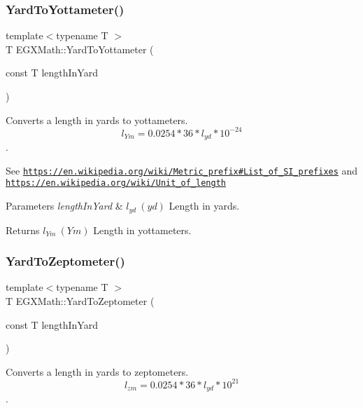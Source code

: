 \subsubsection{\texorpdfstring{Yard\+To\+Yottameter()}{YardToYottameter()}}
{\footnotesize\ttfamily template$<$typename T $>$ \\
T E\+G\+X\+Math\+::\+Yard\+To\+Yottameter (\begin{DoxyParamCaption}\item[{const T}]{length\+In\+Yard }\end{DoxyParamCaption})}



Converts a length in yards to yottameters. \[ l_{Ym}=0.0254 * 36 * l_{yd} * 10^{-24} \]. 

See \href{https://en.wikipedia.org/wiki/Metric_prefix#List_of_SI_prefixes}{\tt https\+://en.\+wikipedia.\+org/wiki/\+Metric\+\_\+prefix\#\+List\+\_\+of\+\_\+\+S\+I\+\_\+prefixes} and \href{https://en.wikipedia.org/wiki/Unit_of_length}{\tt https\+://en.\+wikipedia.\+org/wiki/\+Unit\+\_\+of\+\_\+length} 
\begin{DoxyParams}{Parameters}
{\em length\+In\+Yard} & $ l_{yd}\ (yd)$ Length in yards. \\
\hline
\end{DoxyParams}
\begin{DoxyReturn}{Returns}
$ l_{Ym}\ (Ym)$ Length in yottameters. 
\end{DoxyReturn}
\mbox{\label{group___e_g_x_math-_conversions-_length_conversions-_imperial-_yard-_s_i_ga4232d885aeba5690a169c72927d57d4e}} 
\subsubsection{\texorpdfstring{Yard\+To\+Zeptometer()}{YardToZeptometer()}}
{\footnotesize\ttfamily template$<$typename T $>$ \\
T E\+G\+X\+Math\+::\+Yard\+To\+Zeptometer (\begin{DoxyParamCaption}\item[{const T}]{length\+In\+Yard }\end{DoxyParamCaption})}



Converts a length in yards to zeptometers. \[ l_{zm}=0.0254 * 36 * l_{yd} * 10^{21} \]. 

